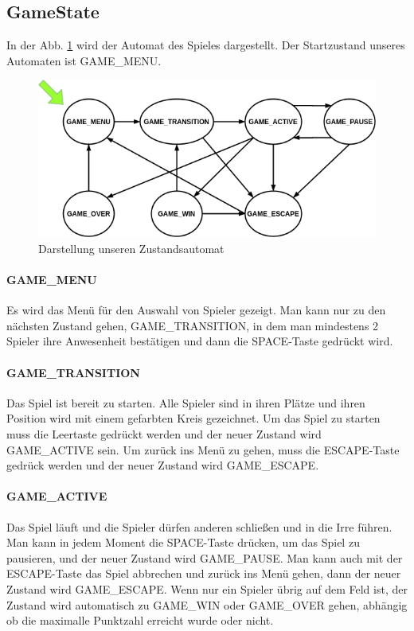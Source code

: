 \documentclass[doktyp=studarbeit]{TUBAFarbeiten}
\begin{document}
\FloatBarrier
\subsection{GameState}

In der Abb. \ref{fig:state-machine} wird der Automat des Spieles dargestellt. 
Der Startzustand unseres Automaten ist GAME\_MENU. 

\begin{figure}
    \centering
    \includegraphics[width=0.7\linewidth]{state_machine.png}
	\caption{Darstellung unseren Zustandsautomat}
	\label{fig:state-machine}
\end{figure}

\paragraph{GAME\_MENU}
Es wird das Menü für den Auswahl von Spieler gezeigt. Man kann nur zu den
nächsten Zustand gehen, GAME\_TRANSITION, in dem man mindestens 2 Spieler
ihre Anwesenheit bestätigen und dann die SPACE-Taste gedrückt wird.
\paragraph{GAME\_TRANSITION}
Das Spiel ist bereit zu starten. Alle Spieler sind in ihren Plätze und ihren
Position wird mit einem gefarbten Kreis gezeichnet. Um das Spiel zu starten
muss die Leertaste gedrückt werden und der neuer Zustand wird GAME\_ACTIVE sein.
Um zurück ins Menü zu gehen, muss die ESCAPE-Taste gedrück werden und der neuer
Zustand wird GAME\_ESCAPE.
\paragraph{GAME\_ACTIVE}
Das Spiel läuft und die Spieler dürfen anderen schließen und in die Irre führen.
Man kann in jedem Moment die SPACE-Taste drücken, um das Spiel zu pausieren,
und der neuer Zustand wird GAME\_PAUSE. Man kann auch mit der ESCAPE-Taste das
Spiel abbrechen und zurück ins Menü gehen, dann der neuer Zustand wird 
GAME\_ESCAPE. Wenn nur ein Spieler übrig auf dem Feld ist, der Zustand wird 
automatisch zu GAME\_WIN oder GAME\_OVER gehen, abhängig ob die maximalle 
Punktzahl erreicht wurde oder nicht.
\end{document}
